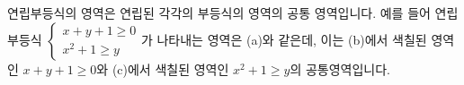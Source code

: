 \begin{figure}[h]
  \qquad
\end{figure}


연립부등식의 영역은 연립된 각각의 부등식의 영역의 공통 영역입니다. 예를 들어 연립부등식 \( \begin{cases}
x+y+1 \ge 0 \\[-.2em]
x^2 + 1 \ge y\end{cases}\)가 나타내는 영역은 (a)와 같은데, 이는 (b)에서 색칠된 영역인 $x+y+1 \ge 0$와 (c)에서 색칠된 영역인 $x^2 + 1 \ge y$의 공통영역입니다. 



